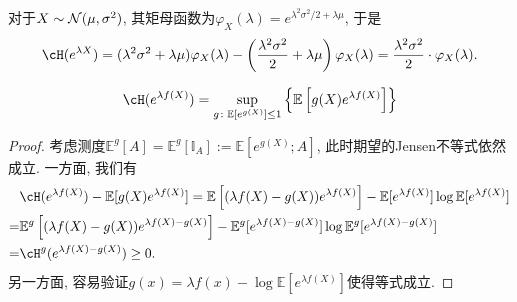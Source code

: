 \begin{example}[Gauss随机变量的熵]
	对于$X \sim \mathcal{N}(\mu, \sigma^2)$, 其矩母函数为$\varphi_X(\lambda) = e^{\lambda^2 \sigma^2 / 2 + \lambda \mu}$, 于是
	\begin{equation}\label{eq:EntropyOfGaussianRV}
		\cH(e^{\lambda X}) 
		= (\lambda^2 \sigma^2 + \lambda \mu) \varphi_X(\lambda) - \left(\frac{\lambda^2 \sigma^2}{2} + \lambda\mu\right) \varphi_X(\lambda) 
		= \frac{\lambda^2 \sigma^2}{2} \cdot \varphi_X(\lambda). 
	\end{equation}
\end{example}

\begin{theorem}[熵的变分表示]\label{thm:VariationalRepresentationForEntropy}
	\begin{equation}\label{eq:VariationalRepresentationForEntropy}
		\cH(e^{\lambda f(X)})
		= \sup_{g \colon \mathbb{E}[e^{g(X)}] \leq 1} \left\{ \mathbb{E} \left[g(X) e^{\lambda f(X)} \right] \right\}
	\end{equation}
\end{theorem}
\begin{proof}
	考虑测度$\mathbb{E}^g[A] = \mathbb{E}^g [\mathbb{I}_A] := \mathbb{E}[e^{g(X)}; A]$, 此时期望的Jensen不等式依然成立. 
	一方面, 我们有
	\begin{align*}
		&\cH(e^{\lambda f(X)}) - \mathbb{E}[g(X) e^{\lambda f(X)}]
		= \mathbb{E}\left[ (\lambda f(X) - g(X)) e^{\lambda f(X)} \right] - \mathbb{E}[ e^{\lambda f(X)}] \log \mathbb{E}[ e^{\lambda f(X)}] \\
		=& \mathbb{E}^g  \left[ (\lambda f(X) - g(X)) e^{\lambda f(X) - g(X)} \right] - \mathbb{E}^g[ e^{\lambda f(X) - g(X)}] \log \mathbb{E}^g[ e^{\lambda f(X) - g(X)}] \\
		=& \cH^g(e^{\lambda f(X) - g(X)}) \geq 0. 
	\end{align*}
	另一方面, 容易验证$g(x) = \lambda f(x) - \log \mathbb{E}[e^{\lambda f(X)}]$使得等式成立. 
\end{proof}

